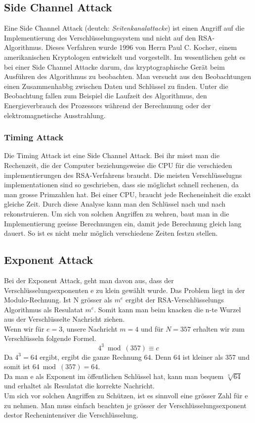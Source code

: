 %
\subsection{Side Channel Attack}
Eine Side Channel Attack (deutch: \textit{Seitenkanalattacke}) ist einen Angriff auf die Implementierung des Verschlüsselungssystem und nicht auf den RSA-Algorithmus. Dieses Verfahren wurde 1996 von Herrn Paul C. Kocher, einem amerikanischen Kryptologen entwickelt und vorgestellt.
Im wesentlichen geht es bei einer Side Channel Attacke darum, das kryptographische Gerät beim Ausführen des Algorithmus zu beobachten.
Man versucht aus den Beobachtungen einen Zusammenhabbg zwischen Daten und Schlüssel zu finden.
Unter die Beobachtung fallen zum Beispiel die Laufzeit des Algorithmus, den Energieverbrauch des Prozessors während der Berechunung oder der elektromagnetische Ausstrahlung.
%
\subsubsection{Timing Attack}
Die Timing Attack ist eine Side Channel Attack. 
Bei ihr misst man die Rechenzeit, die der Computer beziehungsweise die CPU für die verschieden implementierungen des RSA-Verfahrens braucht. Die meisten Verschlüsselugns implementationen sind so geschrieben, dass sie möglichst schnell rechenen, da man grosse Primzahlen hat. Bei einer CPU, braucht jede Recheneinheit die exakt gleiche Zeit. Durch diese Analyse kann man den Schlüssel nach und nach rekonstruieren.
%
Um sich von solchen Angriffen zu wehren, baut man in die Implementierung geeisse Berechnungen ein, damit jede Berechnung gleich lang dauert. So ist es nicht mehr möglich verschiedene Zeiten festzu stellen.
%
%
\subsection{Exponent Attack}
Bei der Exponent Attack, geht man davon aus, dass der Verschlüsselungsexponenten e zu klein gewählt wurde. Das Problem liegt in der Modulo-Rechnung. Ist N grösser als $m^e$ ergibt der RSA-Verschlüsselungs Algorithmus als Resulatat $m^e$. Somit kann man beim knacken die n-te Wurzel aus der Verschlüsselte Nachricht ziehen. \\
Wenn wir für $e = 3$, unsere Nachricht $m = 4$ und für $N = 357$ erhalten wir zum Verschlüsseln folgende Formel.
\begin{equation*}
  4^3 \bmod(357) \equiv c
\end{equation*}
Da $4^3 = 64$ ergibt, ergibt die ganze Rechnung 64. Denn 64 ist kleiner als 357 und somit ist $64 \bmod(357) = 64$.\\
Da man e als Exponent im öffentlichen Schlüssel hat, kann man bequem $\sqrt[3]{64}$ und erhaltet als Resulatat die korrekte Nachricht.\\
%
Um sich vor solchen Angriffen zu Schützen, ist es sinnvoll eine grösser Zahl für e zu nehmen. Man muss einfach beachten je grösser der Verschlüsselungsexponent destor Rechenintensiver die Verschlüsselung.
